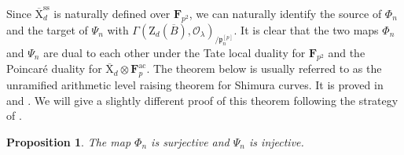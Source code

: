 \documentclass[10pt]{amsart}
\numberwithin{equation}{section}
\theoremstyle{plain}
\newtheorem{proposition}[theorem]{Proposition}
\numberwithin{equation}{section}
\theoremstyle{definition}
\theoremstyle{remark}
\def\ac{\mathrm{ac}}
\def\ss{\mathrm{ss}}
\def\ac{\mathrm{ac}}
\def\calO{\mathcal{O}}
\def\frakp{\mathfrak{p}}
\def\FF{\mathbf{F}}
\def\rmX{\mathrm{X}}
\def\rmZ{\mathrm{Z}}
\begin{document}
Since $\overline{\rmX}^{\ss}_{d}$ is naturally defined over $\FF_{p^{2}}$, we can naturally identify the source of $\Phi_{n}$ and the target of $\Psi_{n}$ with $\Gamma(\rmZ_{d}(\overline{B}), \calO_{\lambda})_{/\frakp^{[p]}_{n}}$. It is clear that the two  maps $\Phi_{n}$ and $\Psi_{n}$ are dual to each other under the Tate local duality for $\FF_{p^{2}}$ and the Poincar\'e duality for $\overline{\rmX}_{d}\otimes{\FF^{\ac}_{p}}$. The theorem below is usually referred to as the unramified arithmetic level raising theorem for Shimura curves. It is proved in \cite[Proposition 4.8]{LT} and \cite{Xiao}. We will give a slightly different proof of this theorem following the strategy of \cite{Xiao}.

\begin{proposition}\label{Phi-n}
The map $\Phi_{n}$ is surjective and $\Psi_{n}$ is injective.
\end{proposition}
\end{document}
